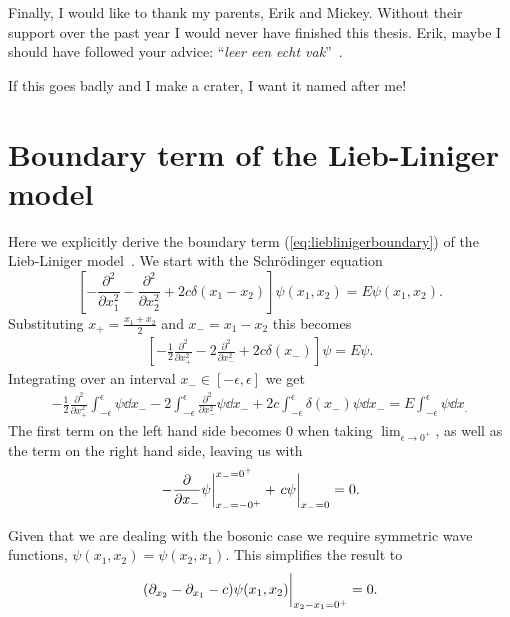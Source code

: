 \documentclass[11pt, a4paper]{report} %
\begin{document}
Finally, I would like to thank my parents, Erik and Mickey.
Without their support over the past year I would never have finished this thesis.
Erik, maybe I should have followed your advice: ``\textit{leer een echt vak}''~\cite{erik}.

\appendix

\begin{savequote}[50mm]
If this goes badly and I make a crater, I want it named after me!
\end{savequote}

\chapter{Boundary term of the Lieb-Liniger model}\label{cha:boundary}

Here we explicitly derive the boundary term (\cref{eq:lieblinigerboundary}) of the Lieb-Liniger model~\cite{Caux2015}.
We start with the Schrödinger equation
\begin{equation}
	\left[- \frac{\partial^2}{\partial x_1^2} - \frac{\partial^2}{\partial x_2^2} + 2c \delta(x_1 - x_2)\right] \psi(x_1, x_2) = E \psi(x_1,x_2).
\end{equation} 
Substituting \(x_+ = \frac{x_1+x_2}{2}\) and \(x_-=x_1-x_2\) this becomes
\begin{align}
  \label{eq:17}
  	\left[-\frac{1}{2}\frac{\partial^2}{\partial x_+^2} - 2\frac{\partial^2}{\partial x_-^2} + 2c \delta(x_-)\right] \psi = E\psi.
\end{align}
Integrating over an interval \(x_-\in[-\epsilon,\epsilon]\) we get
\begin{align}
  \label{eq:18}
  -\frac{1}{2} \frac{\partial^2}{\partial x_+^2} \int_{-\epsilon}^{\epsilon} \psi \dd x_- - 2 \int_{-\epsilon}^{\epsilon} \frac{\partial^2}{\partial x_-^2}\psi \dd x_- + 2c\int_{-\epsilon}^{\epsilon} \delta(x_-)\psi \dd x_- = E\int_{-\epsilon}^{\epsilon} \psi \dd x_.
\end{align}
The first term on the left hand side becomes 0 when taking \(\lim_{\epsilon\to0^+}\), as well as the term on the right hand side, leaving us with
\begin{align}
  \label{eq:19}
  \eval{- \frac{\partial}{\partial x_-} \psi }_{x_-=-0^+}^{x_-=0^+}  + \eval{c\psi}_{x_-=0} = 0.
\end{align}

Given that we are dealing with the bosonic case we require symmetric wave functions, \(\psi(x_1,x_2)=\psi(x_2,x_1)\).
This simplifies the result to
\begin{align}
  \label{eq:20}
  \eval{\qty(\partial_{x_2} - \partial_{x_1} - c) \psi(x_1, x_2)}_{x_2-x_1=0^+} = 0.
\end{align}
\end{document}
